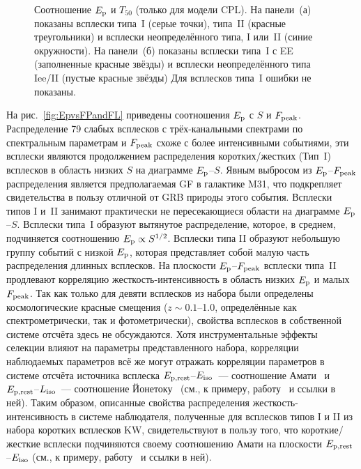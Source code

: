 \begin{figure}
    \begin{minipage}[h]{0.5\textwidth}
    \end{minipage}
    \hfill
    \begin{minipage}[h]{0.5\textwidth}
	\end{minipage}

\caption{
    Соотношение $E_{\mathrm{p}}$ и $T_{50}$ (только для модели CPL).
    На панели~(а) показаны всплески типа~I (серые точки), типа~II (красные треугольники)
    и всплески неопределённого типа, I или~II (синие окружности).
    На панели~(б) показаны всплески типа~I с EE (заполненные красные звёзды)
    и всплески неопределённого типа Iee/II (пустые красные звёзды)
    Для всплесков типа~I ошибки не показаны. 
    \label{fig:EpT50}}
\end{figure}

На рис.~\ref{fig:EpvsFPandFL} приведены соотношения $E_{\mathrm{p}}$ с $S$ и $F_{\mathrm{peak}}$.
Распределение 79 слабых всплесков с трёх-канальными спектрами по спектральным параметрам 
и $F_{\mathrm{peak}}$ схоже с более интенсивными событиями, эти всплески являются продолжением
распределения коротких/жестких (Тип~I) всплесков в область низких $S$  на диаграмме $E_{\mathrm{p}}$--$S$.
Явным выбросом из  $E_{\mathrm{p}}$--$F_{\mathrm{peak}}$ распределения является предполагаемая 
GF в галактике M31, что подкрепляет свидетельства в пользу отличной от GRB природы этого события.
Всплески типов I и~II занимают практически не пересекающиеся области на диаграмме $E_{\mathrm{p}}$--$S$.
Всплески типа~I образуют вытянутое распределение, которое, в среднем, подчиняется 
соотношению $E_{\mathrm{p}} \propto S^{1/2}$. Всплески типа II образуют небольшую группу событий
с низкой $E_{\mathrm{p}}$, которая представляет собой малую часть распределения длинных всплесков.
На плоскости $E_{\mathrm{p}}$--$F_{\mathrm{peak}}$ всплески типа~II продлевают корреляцию 
жесткость-интенсивность в область низких $E_{\mathrm{p}}$ и малых $F_{\mathrm{peak}}$.
Так как только для девяти всплесков из набора были определены космологические 
красные смещения ($z\sim 0.1$--1.0, определённые как спектрометрически, так и
фотометрически), свойства всплесков в собственной системе отсчёта здесь не обсуждаются.
Хотя инструментальные эффекты селекции влияют на параметры представленного набора,
корреляции наблюдаемых параметров всё же могут отражать корреляции параметров 
в системе отсчёта источника всплеска $E_{\mathrm{p,rest}}$--$E_{\mathrm{iso}}$~--- 
соотношение Амати~\citep{Amati_2002AandA} и $E_{\mathrm{p,rest}}$--$L_{\mathrm{iso}}$~--- 
соотношение Йонетоку~\citep{Yonetoku_2004ApJ}
(см., к примеру, работу~\citep{Nava_2008MNRAS} и ссылки в ней).
Таким образом, описанные свойства распределения жесткость-интенсивность 
в системе наблюдателя, полученные для всплесков типов I и II из набора коротких 
всплесков KW, свидетельствуют в пользу того, что короткие/жесткие всплески подчиняются 
своему соотношению Амати на плоскости $E_{\mathrm{p,rest}}$--$E_{\mathrm{iso}}$
(см., к примеру, работу~\citep{Nava_2011MNRAS} и ссылки в ней).

